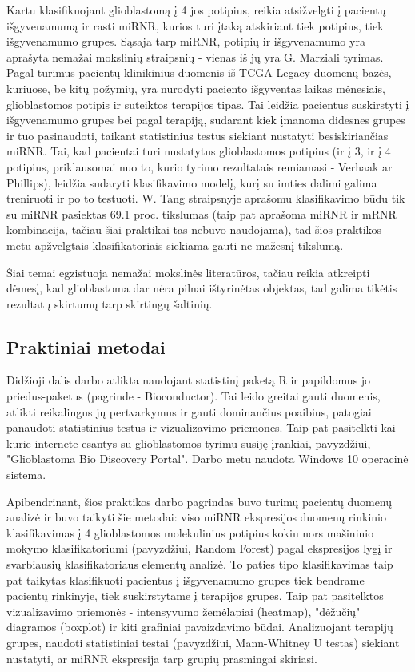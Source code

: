 \documentclass[a4paper,12pt]{article}
\begin{document}
Kartu klasifikuojant glioblastomą į 4 jos potipius, reikia atsižvelgti į pacientų išgyvenamumą ir rasti miRNR, kurios turi įtaką atskiriant tiek potipius, tiek išgyvenamumo grupes. Sąsaja tarp miRNR, potipių ir išgyvenamumo yra aprašyta nemažai mokslinių straipsnių - vienas iš jų yra G. Marziali tyrimas\cite{marziali}. Pagal turimus pacientų klinikinius duomenis iš TCGA Legacy duomenų bazės, kuriuose, be kitų požymių, yra nurodyti paciento išgyventas laikas mėnesiais, glioblastomos potipis ir suteiktos terapijos tipas. Tai leidžia pacientus suskirstyti į išgyvenamumo grupes bei pagal terapiją, sudarant kiek įmanoma didesnes grupes ir tuo pasinaudoti, taikant statistinius testus siekiant nustatyti besiskiriančias miRNR. Tai, kad pacientai turi nustatytus glioblastomos potipius (ir į 3, ir į 4 potipius, priklausomai nuo to, kurio tyrimo rezultatais remiamasi - Verhaak ar Phillips), leidžia sudaryti klasifikavimo modelį, kurį su imties dalimi galima treniruoti ir po to testuoti. W. Tang\cite{tang} straipsnyje aprašomu klasifikavimo būdu tik su miRNR pasiektas 69.1 proc. tikslumas (taip pat aprašoma miRNR ir mRNR kombinacija, tačiau šiai praktikai tas nebuvo naudojama), tad šios praktikos metu apžvelgtais klasifikatoriais siekiama gauti ne mažesnį tikslumą.

Šiai temai egzistuoja nemažai mokslinės literatūros, tačiau reikia atkreipti dėmesį, kad glioblastoma dar nėra pilnai ištyrinėtas objektas, tad galima tikėtis rezultatų skirtumų tarp skirtingų šaltinių.

\subsection{Praktiniai metodai}
\indent\indent
Didžioji dalis darbo atlikta naudojant statistinį paketą R\cite{R} ir papildomus jo priedus-paketus (pagrinde - Bioconductor\cite{bioconductor}). Tai leido greitai gauti duomenis, atlikti reikalingus jų pertvarkymus ir gauti dominančius poaibius, patogiai panaudoti statistinius testus ir vizualizavimo priemones. Taip pat pasitelkti kai kurie internete esantys su glioblastomos tyrimu susiję įrankiai, pavyzdžiui, "Glioblastoma Bio Discovery Portal"\cite{gbdp}. Darbo metu naudota Windows 10 operacinė sistema.

Apibendrinant, šios praktikos darbo pagrindas buvo turimų pacientų duomenų analizė ir buvo taikyti šie metodai: viso miRNR ekspresijos duomenų rinkinio klasifikavimas į 4 glioblastomos molekulinius potipius kokiu nors mašininio mokymo klasifikatoriumi (pavyzdžiui, Random Forest) pagal ekspresijos lygį ir svarbiausių klasifikatoriaus elementų analizė. To paties tipo klasifikavimas taip pat taikytas klasifikuoti pacientus į išgyvenamumo grupes tiek bendrame pacientų rinkinyje, tiek suskirstytame į terapijos grupes.
Taip pat pasitelktos vizualizavimo priemonės - intensyvumo žemėlapiai (heatmap), "dėžučių" diagramos (boxplot) ir kiti grafiniai pavaizdavimo būdai. Analizuojant terapijų grupes, naudoti statistiniai testai (pavyzdžiui, Mann-Whitney U testas) siekiant nustatyti, ar miRNR ekspresija tarp grupių prasmingai skiriasi.
\end{document}
